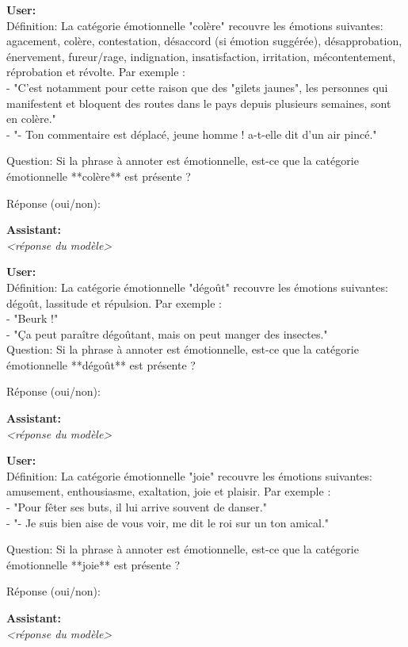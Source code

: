 {\textbf{User:}\\
Définition: La catégorie émotionnelle "colère" recouvre les émotions suivantes: agacement, colère, contestation, désaccord (si émotion suggérée), désapprobation, énervement, fureur/rage, indignation, insatisfaction, irritation, mécontentement, réprobation et révolte. Par exemple :\\
- "C'est notamment pour cette raison que des "gilets jaunes", les personnes qui manifestent et bloquent des routes dans le pays depuis plusieurs semaines, sont en colère."\\
- "- Ton commentaire est déplacé, jeune homme ! a-t-elle dit d'un air pincé."

Question: Si la phrase à annoter est émotionnelle, est-ce que la catégorie émotionnelle **colère** est présente ?

Réponse (oui/non):

\textbf{Assistant:}\\
\textit{<réponse du modèle>}

\textbf{User:}\\
Définition: La catégorie émotionnelle "dégoût" recouvre les émotions suivantes: dégoût, lassitude et répulsion. Par exemple :\\
- "Beurk !"\\
- "Ça peut paraître dégoûtant, mais on peut manger des insectes."\\

Question: Si la phrase à annoter est émotionnelle, est-ce que la catégorie émotionnelle **dégoût** est présente ?

Réponse (oui/non):

\textbf{Assistant:}\\
\textit{<réponse du modèle>}

\textbf{User:}\\
Définition: La catégorie émotionnelle "joie" recouvre les émotions suivantes: amusement, enthousiasme, exaltation, joie et plaisir. Par exemple :\\
- "Pour fêter ses buts, il lui arrive souvent de danser."\\
- "- Je suis bien aise de vous voir, me dit le roi sur un ton amical."

Question: Si la phrase à annoter est émotionnelle, est-ce que la catégorie émotionnelle **joie** est présente ?

Réponse (oui/non):

\textbf{Assistant:}\\
\textit{<réponse du modèle>}

}
